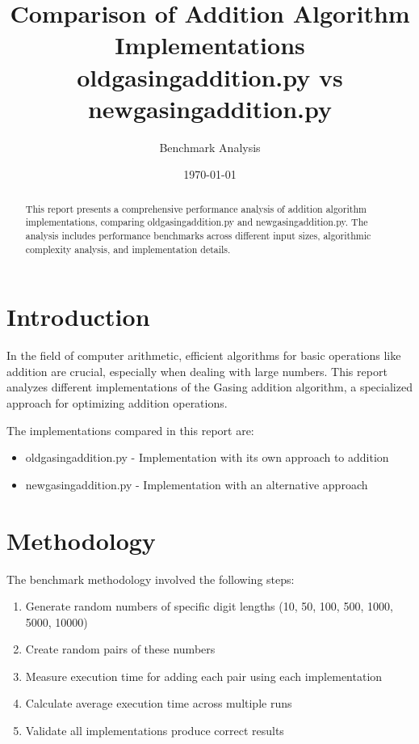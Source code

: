 \documentclass{article}
\title{Comparison of Addition Algorithm Implementations\\
\large oldgasingaddition.py vs newgasingaddition.py}
\author{Benchmark Analysis}
\date{\today}
\begin{document}
\maketitle

\begin{abstract}
This report presents a comprehensive performance analysis of addition algorithm implementations, comparing oldgasingaddition.py and newgasingaddition.py. The analysis includes performance benchmarks across different input sizes, algorithmic complexity analysis, and implementation details.
\end{abstract}

\section{Introduction}

In the field of computer arithmetic, efficient algorithms for basic operations like addition are crucial, especially when dealing with large numbers. This report analyzes different implementations of the Gasing addition algorithm, a specialized approach for optimizing addition operations.

The implementations compared in this report are:
\begin{itemize}
    \item oldgasingaddition.py - Implementation with its own approach to addition
    \item newgasingaddition.py - Implementation with an alternative approach
\end{itemize}

\section{Methodology}

The benchmark methodology involved the following steps:
\begin{enumerate}
    \item Generate random numbers of specific digit lengths (10, 50, 100, 500, 1000, 5000, 10000)
    \item Create random pairs of these numbers
    \item Measure execution time for adding each pair using each implementation
    \item Calculate average execution time across multiple runs
    \item Validate all implementations produce correct results
\end{enumerate}
\end{document}
